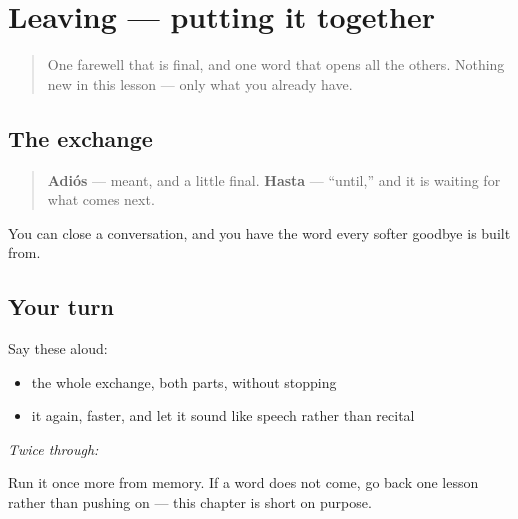 \section[Practice]{Leaving — putting it together}

\label{lesson:ES-C05-repaso-adios}



\begin{quote}
One farewell that is final, and one word that opens all the others. Nothing new in this lesson — only what you already have.
\end{quote}

\subsection*{The exchange}
\begin{quote}
\textbf{Adiós} — meant, and a little final. \textbf{Hasta} — \textquotedblleft{}until,\textquotedblright{} and it is waiting for what comes next.
\end{quote}

\begin{grammarlens}[title={What you've built}]
You can close a conversation, and you have the word every softer goodbye is built from.
\end{grammarlens}

\subsection*{Your turn}
Say these aloud:

\begin{itemize}
\raggedright
  \item the whole exchange, both parts, without stopping
  \item it again, faster, and let it sound like speech rather than recital
\end{itemize}

\emph{Twice through:}

\begin{tcolorbox}[breakable,colback=teal!4,colframe=teal!35!black,title={Before you move on}]
Run it once more from memory. If a word does not come, go back one lesson rather than pushing on — this chapter is short on purpose.
\end{tcolorbox}
